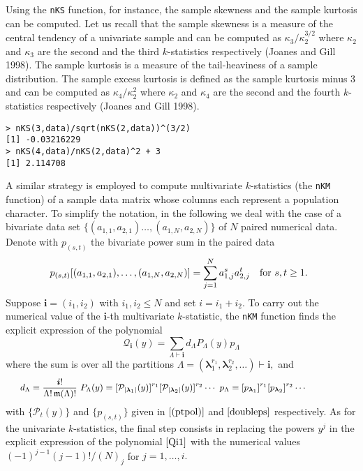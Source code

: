 Using the \texttt{nKS} function, for instance, the sample skewness and the sample kurtosis can be computed. Let us recall that the sample skewness is a measure of the central tendency of a univariate sample and can be computed as \(\kappa_3/\kappa_2^{3/2}\) where \(\kappa_2\) and \(\kappa_3\) are the second and the third \(k\)-statistics respectively (Joanes and Gill 1998). The sample kurtosis is a measure of the tail-heaviness of a sample distribution. The sample excess kurtosis is defined as the sample kurtosis minus 3 and can be computed as \(\kappa_4/\kappa_2^{2}\) where \(\kappa_2\) and \(\kappa_4\) are the second and the fourth \(k\)-statistics respectively (Joanes and Gill 1998).

\begin{verbatim}
> nKS(3,data)/sqrt(nKS(2,data))^(3/2)
[1] -0.03216229
> nKS(4,data)/nKS(2,data)^2 + 3
[1] 2.114708
\end{verbatim}

A similar strategy is employed to compute multivariate \(k\)-statistics (the \texttt{nKM} function) of a sample data matrix whose columns each represent a population character. To simplify the notation, in the following we deal with the case of a bivariate data set \(\{(a_{1,1},a_{2,1}) \ldots, (a_{1,N},a_{2,N})\}\) of \(N\) paired numerical data. Denote with \(p_{(s,t)}\) the bivariate power sum in the paired data
\begin{equation}
\!\!\!p_{(s,t)}[(a_{1,1},a_{2,1}), \ldots, (a_{1,N},a_{2,N})] = \sum_{j=1}^N a^s_{1,j} a^t_{2,j}
\quad \hbox{for} \,\, s,t \geq 1.
\label{doubleps}
\end{equation}
Suppose \(\boldsymbol{i}=(i_1, i_2)\) with \(i_1, i_2 \leq N\) and set \(i=i_1+i_2.\) To carry out the numerical value of the \(\boldsymbol{i}\)-th multivariate \(k\)-statistic, the \texttt{nKM} function finds the explicit expression of the polynomial
\begin{equation}
{\mathcal Q}_{\boldsymbol{i}}(y) =  \sum_{\Lambda \vdash \boldsymbol{i}} d_{\Lambda}  P_{\Lambda}(y)
p_{\Lambda}
\label{Qi1}
\end{equation}
where the sum is over all the partitions \(\Lambda=(\boldsymbol{\lambda}_1^{r_1}, \boldsymbol{\lambda}_2^{r_2},\ldots) \vdash \boldsymbol{i},\) and
\begin{equation}
\hskip-1.5cm{\small d_{\Lambda} = \frac{\boldsymbol{i}!}{\Lambda! \, \mathfrak{m}(\Lambda)!} \,\, 
P_{\Lambda}(y)  = 
  [{\mathcal P}_{|\boldsymbol{\lambda}_1|}(y)]^{r_1}  [{\mathcal P}_{|\boldsymbol{\lambda}_2|}(y)]^{r_2} \cdots \,\, p_{\Lambda} = 
[p_{\boldsymbol{\lambda}_1}]^{r_1} [p_{\boldsymbol{\lambda}_2}]^{r_2}  \cdots
\label{dlm}}\!\!\!
\end{equation}
with \(\{{\mathcal P}_{t}(y)\}\) and \(\{p_{(s,t)}\}\) given in \(\eqref{(ptpol)}\) and \(\eqref{doubleps}\) respectively. As for the univariate \(k\)-statistics, the final step consists in replacing the powers \(y^j\) in the explicit expression of the polynomial \(\eqref{Qi1}\) with the numerical values \((-1)^{j-1} (j-1)!/(N)_j\) for \(j=1, \ldots,i.\)


